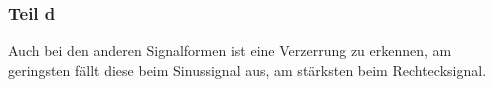 \subsubsection{Teil d}

Auch bei den anderen Signalformen ist eine Verzerrung zu erkennen, am geringsten fällt diese beim Sinussignal aus, am stärksten beim Rechtecksignal.

\IfFileExists{\bibliographyfile}{
	
}{}



